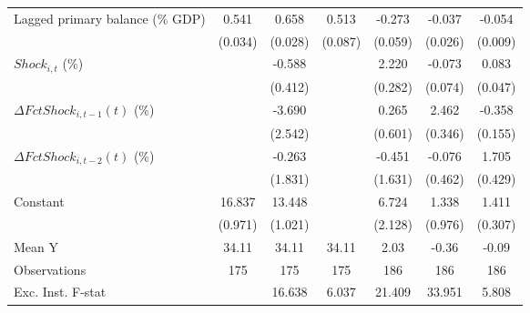 {\begin{tabular}{l*{6}{c}}
\addlinespace
Lagged primary balance (\% GDP)&       0.541\sym{***}&       0.658\sym{***}&       0.513\sym{***}&      -0.273\sym{***}&      -0.037         &      -0.054\sym{***}\\
                    &     (0.034)         &     (0.028)         &     (0.087)         &     (0.059)         &     (0.026)         &     (0.009)         \\
\addlinespace
$ Shock_{i,t}$ (\%) &                     &      -0.588         &                     &       2.220\sym{***}&      -0.073         &       0.083         \\
                    &                     &     (0.412)         &                     &     (0.282)         &     (0.074)         &     (0.047)         \\
\addlinespace
$ \Delta FctShock_{i,t-1}(t)$ (\%)&                     &      -3.690         &                     &       0.265         &       2.462\sym{***}&      -0.358\sym{**} \\
                    &                     &     (2.542)         &                     &     (0.601)         &     (0.346)         &     (0.155)         \\
\addlinespace
$ \Delta FctShock_{i,t-2}(t)$ (\%)&                     &      -0.263         &                     &      -0.451         &      -0.076         &       1.705\sym{***}\\
                    &                     &     (1.831)         &                     &     (1.631)         &     (0.462)         &     (0.429)         \\
\addlinespace
Constant            &      16.837\sym{***}&      13.448\sym{***}&                     &       6.724\sym{**} &       1.338         &       1.411\sym{***}\\
                    &     (0.971)         &     (1.021)         &                     &     (2.128)         &     (0.976)         &     (0.307)         \\
\midrule
Mean Y              &       34.11         &       34.11         &       34.11         &        2.03         &       -0.36         &       -0.09         \\
Observations        &         175         &         175         &         175         &         186         &         186         &         186         \\
Exc. Inst. F-stat   &                     &      16.638         &       6.037         &      21.409         &      33.951         &       5.808         \\
\bottomrule
\end{tabular}
}
